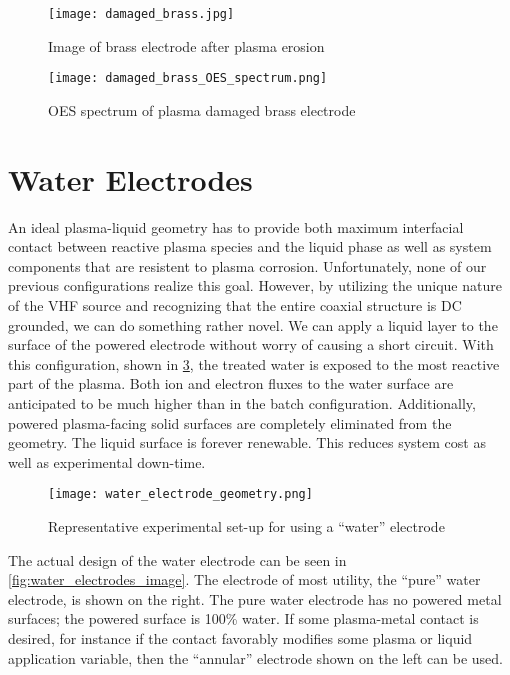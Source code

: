 \begin{figure}[htbp]
  \centering
  \texttt{[image: damaged\_brass.jpg]}
  \caption{Image of brass electrode after plasma erosion}
  \label{fig:brass_damage_full}
\end{figure}

\begin{figure}[htbp]
  \centering
  \texttt{[image: damaged\_brass\_OES\_spectrum.png]}
  \caption{OES spectrum of plasma damaged brass electrode}
  \label{fig:OES_brass_damage}
\end{figure}

\section{Water Electrodes}
\label{sec:water_electrodes}

An ideal plasma-liquid geometry has to provide both maximum interfacial contact between reactive plasma species and the liquid phase as well as system components that are resistent to plasma corrosion. Unfortunately, none of our previous configurations realize this goal. However, by utilizing the unique nature of the VHF source and recognizing that the entire coaxial structure is DC grounded, we can do something rather novel. We can apply a liquid layer to the surface of the powered electrode without worry of causing a short circuit. With this configuration, shown in \cref{fig:water_electrode_scheme}, the treated water is exposed to the most reactive part of the plasma. Both ion and electron fluxes to the water surface are anticipated to be much higher than in the batch configuration. Additionally, powered plasma-facing solid surfaces are completely eliminated from the geometry. The liquid surface is forever renewable. This reduces system cost as well as experimental down-time.

\begin{figure}[htbp]
  \centering
  \texttt{[image: water\_electrode\_geometry.png]}
  \caption{Representative experimental set-up for using a ``water'' electrode}
  \label{fig:water_electrode_scheme}
\end{figure}

The actual design of the water electrode can be seen in \cref{fig:water_electrodes_image}. The electrode of most utility, the ``pure'' water electrode, is shown on the right. The pure water electrode has no powered metal surfaces; the powered surface is 100\% water. If some plasma-metal contact is desired, for instance if the contact favorably modifies some plasma or liquid application variable, then the ``annular'' electrode shown on the left can be used.

